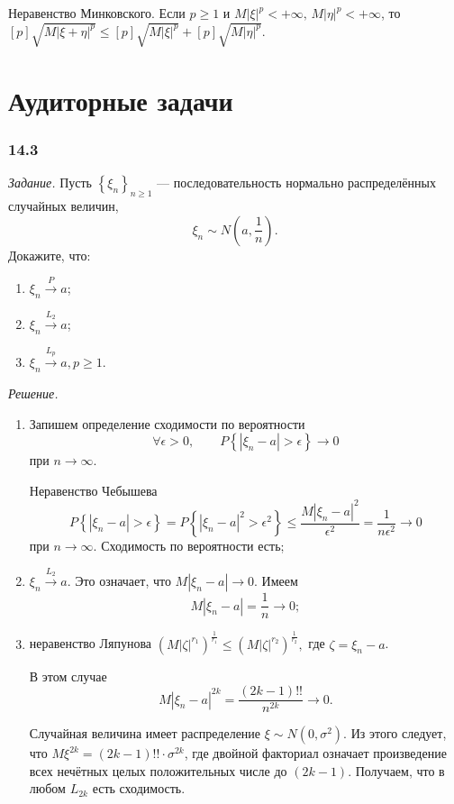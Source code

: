 Неравенство Минковского.
Если $p \geq 1$ и $M \left| \xi \right|^p < + \infty, \, M \left| \eta \right|^p < + \infty $,
то $[p]\sqrt{M \left| \xi + \eta \right|^p} \leq [p]\sqrt{M \left| \xi \right|^p} + [p]\sqrt{M \left| \eta \right|^p}$.

\section*{Аудиторные задачи}

\subsubsection*{14.3}

\textit{Задание.} Пусть $ \left\{ \xi_n \right\}_{n \geq 1}$ --- последовательность нормально распределённых случайных величин,
$$ \xi_n \sim N \left( a, \frac{1}{n} \right).$$
Докажите, что:
\begin{enumerate}[label=\alph*)]
\item $ \xi_n \overset{P}{ \rightarrow } a$;
\item $ \xi_n \overset{L_2}{ \rightarrow } a$;
\item $ \xi_n \overset{L_p}{ \rightarrow } a, p \geq 1$.
\end{enumerate}

\textit{Решение.}
\begin{enumerate}[label=\alph*)]
\item Запишем определение сходимости по вероятности
$$ \forall \epsilon > 0,
\qquad P \left\{ \left| \xi_n - a \right| > \epsilon \right\} \rightarrow 0$$
при $n \rightarrow \infty $.

Неравенство Чебышева
$$P \left\{ \left| \xi_n - a \right| > \epsilon \right\} =
P \left\{ \left| \xi_n - a \right|^2 > \epsilon^2 \right\} \leq
\frac{M \left| \xi_n - a \right|^2}{ \epsilon^2} =
\frac{1}{n \epsilon^2} \rightarrow
0$$
при $n \to \infty $.
Сходимость по вероятности есть;
\item $ \xi_n \overset{L_2}{ \rightarrow } a$.
Это означает, что $M \left| \xi_n - a \right| \rightarrow 0$.
Имеем
$$M \left| \xi_n - a \right| =
\frac{1}{n} \rightarrow
0;$$
\item неравенство Ляпунова
$ \left( M \left| \zeta \right|^{r_1} \right)^{ \frac{1}{r_1}} \leq \left( M \left| \zeta \right|^{r_2} \right)^{ \frac{1}{r_2}},$ где $ \zeta = \xi_n - a$.

В этом случае
$$M \left| \xi_n - a \right|^{2k} =
\frac{ \left( 2k-1 \right)!!}{n^{2k}} \rightarrow
0.$$

Случайная величина имеет распределение $ \xi \sim N \left( 0, \sigma^2 \right) $.
Из этого следует, что $M \xi^{2k} = \left( 2k-1 \right)!! \cdot \sigma^{2k}$,
где двойной факториал означает произведение всех нечётных целых положительных числе до $ \left( 2k-1 \right) $.
Получаем, что в любом $L_{2k}$ есть сходимость.
\end{enumerate}

